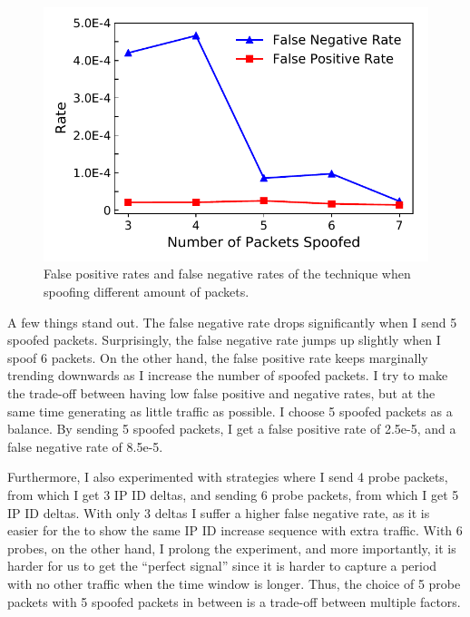 \begin{figure}[t]
\centering
\includegraphics[width=0.85\columnwidth]{data_usage/images/false_positive_negative.pdf}
\caption{False positive rates and false negative rates of the technique when spoofing different amount of packets.}
\label{fig:fp_fn_analysis}
\end{figure}

A few things stand out. The false negative rate drops significantly when I
send 5 spoofed packets. Surprisingly, the false negative rate jumps up
slightly when I spoof 6 packets. On the other hand, the false positive rate
keeps marginally trending downwards as I increase the number of spoofed
packets. I try to make the trade-off between having low false positive and
negative rates, but at the same time generating as little traffic as possible.
I choose 5 spoofed packets as a balance. By sending 5 spoofed packets, I
get a false positive rate of 2.5e-5, and a false negative rate of 8.5e-5.

Furthermore, I also experimented with strategies where I send 4 probe packets, from which
I get 3 IP ID deltas, and sending 6 probe packets, from which I get 5 IP ID
deltas. With only 3 deltas I suffer a higher false negative rate, as it is
easier for the {} to show the same IP ID increase sequence with
extra traffic. With 6 probes, on the other hand, I prolong the experiment,
and more importantly, it is harder for us to get the ``perfect signal'' since
it is harder to capture a period with no other traffic when the time window
is longer. Thus, the choice of 5 probe packets with 5 spoofed packets in
between is a trade-off between multiple factors.

